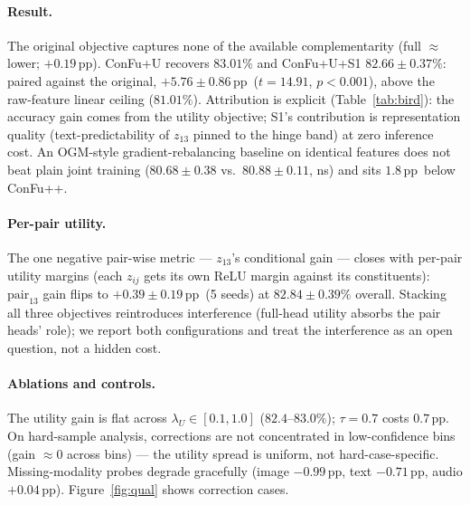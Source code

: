 \documentclass[10pt,twocolumn,letterpaper]{article}
\newcommand{\pp}{\,pp}
\begin{document}
\begin{table}[t]\centering\small
\caption{Bird-MML frozen-feature matrix (5 seeds, paired).}
\label{tab:bird}
\end{table}

\paragraph{Result.} The original objective captures none of the available complementarity
(full ${\approx}$ lower; $+0.19$\pp). ConFu+U recovers $83.01\%$ and ConFu+U+S1
$82.66{\pm}0.37\%$: paired against the original, $+5.76{\pm}0.86$\pp\ ($t{=}14.91$,
$p{<}0.001$), above the raw-feature linear ceiling ($81.01\%$). Attribution is explicit
(Table~\ref{tab:bird}): the accuracy gain comes from the utility objective; S1's contribution is
representation quality (text-predictability of $z_{13}$ pinned to the hinge band) at zero
inference cost. An OGM-style gradient-rebalancing baseline on identical features does not beat
plain joint training ($80.68{\pm}0.38$ vs.\ $80.88{\pm}0.11$, ns) and sits $1.8$\pp\ below
ConFu++.

\paragraph{Per-pair utility.} The one negative pair-wise metric --- $z_{13}$'s conditional gain
--- closes with per-pair utility margins (each $z_{ij}$ gets its own ReLU margin against its
constituents): $\mathrm{pair}_{13}$ gain flips to $+0.39{\pm}0.19$\pp\ (5 seeds) at
$82.84{\pm}0.39\%$ overall. Stacking all three objectives reintroduces interference
(full-head utility absorbs the pair heads' role); we report both configurations and treat the
interference as an open question, not a hidden cost.

\paragraph{Ablations and controls.} The utility gain is flat across $\lambda_U\in[0.1,1.0]$
($82.4$--$83.0\%$); $\tau=0.7$ costs $0.7$\pp. On hard-sample analysis, corrections are not
concentrated in low-confidence bins (gain $\approx0$ across bins) --- the utility spread is
uniform, not hard-case-specific. Missing-modality probes degrade gracefully (image $-0.99$\pp,
text $-0.71$\pp, audio $+0.04$\pp). Figure~\ref{fig:qual} shows correction cases.
\end{document}
